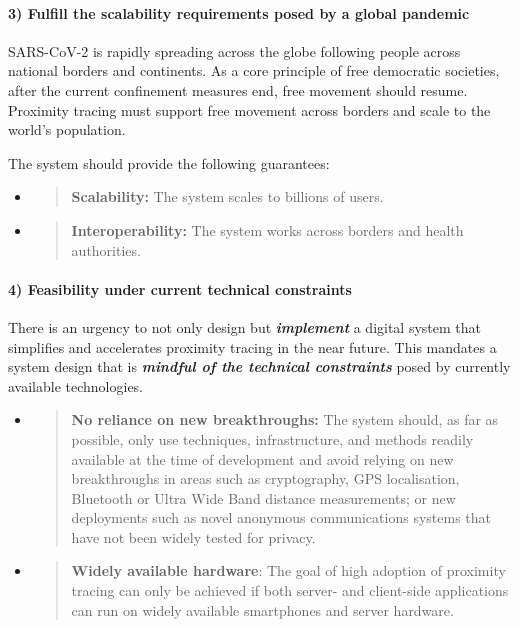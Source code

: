 \documentclass{article}
\begin{document}
\hypertarget{fulfill-the-scalability-requirements-posed-by-a-global-pandemic}{%
\paragraph{3) Fulfill the scalability requirements posed by a global
pandemic}\label{fulfill-the-scalability-requirements-posed-by-a-global-pandemic}}

SARS-CoV-2 is rapidly spreading across the globe following people across
national borders and continents. As a core principle of free democratic
societies, after the current confinement measures end, free movement
should resume. Proximity tracing must support free movement across
borders and scale to the world's population.

The system should provide the following guarantees:

\begin{itemize}
\item
  \begin{quote}
  \textbf{Scalability:} The system scales to billions of users.
  \end{quote}
\item
  \begin{quote}
  \textbf{Interoperability:} The system works across borders and health
  authorities.
  \end{quote}
\end{itemize}

\hypertarget{feasibility-under-current-technical-constraints}{%
\paragraph{4) Feasibility under current technical
constraints}\label{feasibility-under-current-technical-constraints}}

There is an urgency to not only design but \emph{\textbf{implement}} a
digital system that simplifies and accelerates proximity tracing in the
near future. This mandates a system design that is \emph{\textbf{mindful
of the technical constraints}} posed by currently available
technologies.

\begin{itemize}
\item
  \begin{quote}
  \textbf{No reliance on new breakthroughs:} The system should, as far
  as possible, only use techniques, infrastructure, and methods readily
  available at the time of development and avoid relying on new
  breakthroughs in areas such as cryptography, GPS localisation,
  Bluetooth or Ultra Wide Band distance measurements; or new deployments
  such as novel anonymous communications systems that have not been
  widely tested for privacy.
  \end{quote}
\item
  \begin{quote}
  \textbf{Widely available hardware}: The goal of high adoption of
  proximity tracing can only be achieved if both server- and client-side
  applications can run on widely available smartphones and server
  hardware.
  \end{quote}
\end{itemize}
\end{document}
